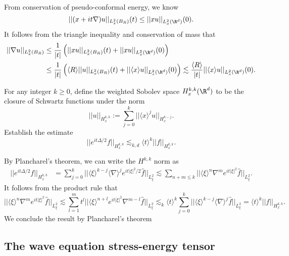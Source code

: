 \begin{solution}
	From conservation of pseudo-conformal energy, we know
		\[ ||(x + it \nabla) u||_{L^2_x (B_R)} (t) \leq ||x u ||_{L^2_x (\R^d)} (0). \]
	It follows from the triangle inequality and conservation of mass that
		\begin{align*}
			 ||\nabla u||_{L^2_x (B_R)} 
			 	&\leq \frac{1}{|t|} \left( ||x u||_{L^2_x (B_R)} (t) + ||x u||_{L^2_x (\R^d)} (0) \right) \\
			 	&\leq \frac{1}{|t|} \left( \langle R \rangle || u||_{L^2_x (B_R)} (t) + ||\langle x \rangle u||_{L^2_x (\R^d)} (0) \right) \lesssim \frac{\langle R \rangle}{|t|} ||\langle x \rangle u||_{L^2_x (\R^d)} (0)  .
		\end{align*}	 
\end{solution}

\begin{statement}
	For any integer $k \geq 0$, define the weighted Sobolev space $H^{k, k}_x (\R^d)$ to be the closure of Schwartz functions under the norm 
		\[ ||u||_{H^{k , k}_x} := \sum_{j = 0}^k ||\langle x \rangle^j u ||_{H^{k - j}_x}. \]
	Establish the estimate
		\[ ||e^{it \Delta/2} f||_{H^{k, k}_x} \lesssim_{k, d} \langle t \rangle^k ||f||_{H^{k, k}_x} .\]		
\end{statement}

\begin{solution}
	By Plancharel's theorem, we can write the $H^{k, k}$ norm as
		\begin{align*}
			||e^{i t \Delta/2} f||_{H^{k, k}_x}
				&= \sum_{j = 0}^k ||\langle \xi \rangle^{k - j} \langle \nabla \rangle^j e^{i t |\xi|^2/2} \widehat f||_{L^2_\xi} \lesssim \sum_{n + m \leq k} || \langle \xi \rangle^n \nabla^m e^{i t |\xi|^2} \widehat f ||_{L^2_\xi}.
		\end{align*}
	It follows from the product rule that 
		\[ || \langle \xi \rangle^n \nabla^m e^{i t |\xi|^2} \widehat f ||_{L^2_\xi} \lesssim \sum_{l = 1}^m t^l || \langle \xi \rangle^{n + l}  e^{i t |\xi|^2}\nabla^{m - l} \widehat f ||_{L^2_\xi} \lesssim_k  \langle t \rangle^k \sum_{j = 0}^k || \langle \xi \rangle^{k - j} \langle \nabla \rangle^j \widehat f||_{L^2_\xi} = \langle t \rangle^k ||f||_{H^{k, k}_x}.  \]
	We conclude the result by Plancharel's theorem
\end{solution}

\subsection{The wave equation stress-energy tensor}

